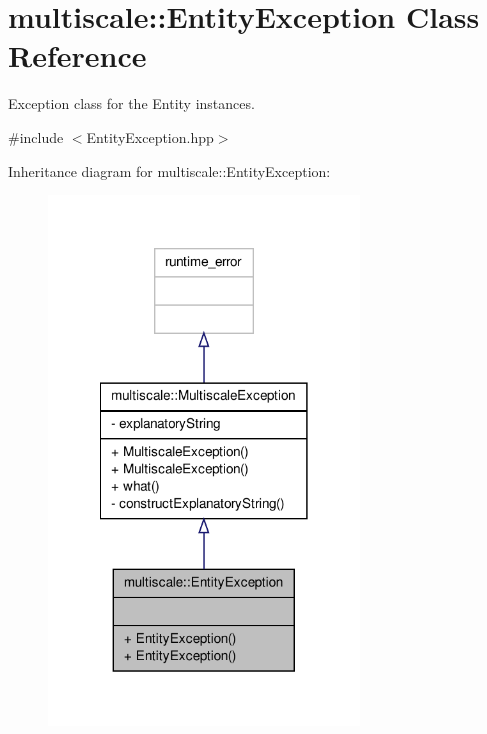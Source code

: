 \hypertarget{classmultiscale_1_1EntityException}{\section{multiscale\-:\-:Entity\-Exception Class Reference}
\label{classmultiscale_1_1EntityException}
}


Exception class for the Entity instances.  




{\ttfamily \#include $<$Entity\-Exception.\-hpp$>$}



Inheritance diagram for multiscale\-:\-:Entity\-Exception\-:
\nopagebreak
\begin{figure}[H]
\begin{center}
\leavevmode
\includegraphics[width=234pt]{classmultiscale_1_1EntityException__inherit__graph}
\end{center}
\end{figure}


